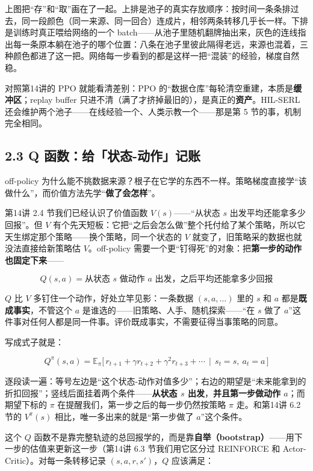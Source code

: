 \documentclass[
  chinese,
]{ctexart}
\begin{document}
上图把``存''和``取''画在了一起。上排是池子的真实存放顺序：按时间一条条排过去，同一段颜色（同一来源、同一回合）连成片，相邻两条转移几乎长一样。下排是训练时真正喂给网络的一个
batch------从池子里随机翻牌抽出来，灰色的连线指出每一条原本躺在池子的哪个位置：八条在池子里彼此隔得老远，来源也混着，三种颜色都进了这一把。网络每一步看到的都是这样一把``混装''的经验，梯度自然稳。

对照第14讲的 PPO 就能看清差别：PPO
的``数据仓库''每轮清空重建，本质是\textbf{缓冲区}；replay buffer
只进不清（满了才挤掉最旧的），是真正的\textbf{资产}。HIL-SERL
还会维护两个池子------在线经验一个、人类示教一个------那是第 5
节的事，机制完全相同。

\subsection{2.3 Q
函数：给「状态-动作」记账}\label{q-ux51fdux6570ux7ed9ux72b6ux6001-ux52a8ux4f5cux8bb0ux8d26}

off-policy
为什么能不挑数据来源？根子在它学的东西不一样。策略梯度直接学``该做什么''，而价值方法先学``\textbf{做了会怎样}''。

第14讲 2.4 节我们已经认识了价值函数 \(V(s)\)------``从状态 \(s\)
出发平均还能拿多少回报''。但 \(V\)
有个先天短板：它把``之后会怎么做''整个托付给了某个策略，所以它天生绑定那个策略------换个策略，同一个状态的
\(V\) 就变了，旧策略采的数据也就没法直接给新策略估 \(V\)。off-policy
需要一个更``钉得死''的对象：把\textbf{第一步的动作也固定下来}------

\[Q(s, a) = \text{从状态 } s \text{ 做动作 } a \text{ 出发，之后平均还能拿多少回报}\]

\(Q\) 比 \(V\) 多钉住一个动作，好处立竿见影：一条数据 \((s, a, \ldots)\)
里的 \(s\) 和 \(a\) 都是\textbf{既成事实}，不管这个 \(a\)
是谁选的------旧策略、人手、随机探索------``在 \(s\) 做了
\(a\)''这件事对任何人都是同一件事。评价既成事实，不需要征得当事策略的同意。

写成式子就是：

\[
Q^\pi(s,a)=\mathbb{E}_{\pi}\big[\,r_{t+1}+\gamma r_{t+2}+\gamma^2 r_{t+3}+\cdots \,\mid\, s_t=s,\ a_t=a\,\big]
\]

逐段读一遍：等号左边是``这个状态-动作对值多少''；右边的期望是``未来能拿到的折扣回报''；竖线后面挂着两个条件------\textbf{从状态
\(s\) 出发}，\textbf{并且第一步做动作 \(a\)}；而期望下标的 \(\pi\)
在提醒我们，第一步之后的每一步仍然按策略 \(\pi\) 走。和第14讲 6.2 节的
\(V^\pi(s)\) 相比，唯一多出来的就是``第一步做了 \(a\)''这个条件。

这个 \(Q\)
函数不是靠完整轨迹的总回报学的，而是靠\textbf{自举（bootstrap）}------用下一步的估值来更新这一步（第14讲
6.3 节我们用它区分过 REINFORCE 和 Actor-Critic）。对每一条转移记录
\((s, a, r, s')\)，\(Q\) 应该满足：
\end{document}
